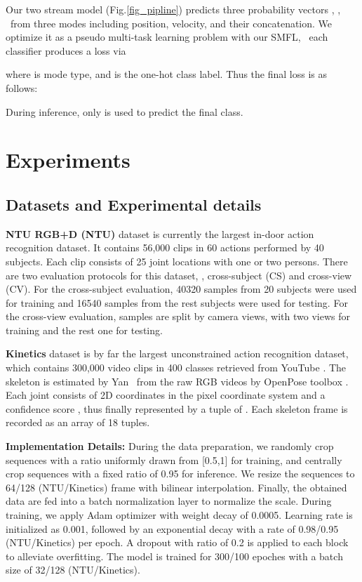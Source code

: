 \documentclass{article}
\begin{document}
Our two stream model (Fig.\ref{fig_pipline}) predicts three probability vectors , , \ from three modes including position, velocity, and their concatenation. We optimize it as a pseudo multi-task learning problem with our SMFL, \ie~each classifier produces a loss via
{\myfont
	
}where  is mode type, and {\myfont} is the one-hot class label. Thus the final loss is as follows:
{\myfont
	
}During inference, only  is used to predict the final class.

\section{Experiments}
\subsection{Datasets and Experimental details}
\textbf{NTU RGB+D (NTU)} dataset  \cite{DBLP:conf/cvpr/ShahroudyLNW16} is currently the largest in-door action recognition dataset. It contains 56,000 clips in 60 actions performed by 40 subjects. Each clip consists of 25 joint locations with one or two persons. There are two evaluation protocols for this dataset, \ie, cross-subject (CS) and cross-view (CV). For the cross-subject evaluation, 40320 samples from 20 subjects were used for training and 16540 samples from the rest subjects were used for testing. For the cross-view evaluation, samples are split by camera views, with two views for training and the rest one for testing.

\textbf{Kinetics} dataset is by far the largest unconstrained action recognition dataset, which contains 300,000 video clips
in 400 classes retrieved from YouTube \cite{DBLP:conf/aaai/YanXL18}. The skeleton is estimated by Yan \etal~from the raw RGB videos by OpenPose toolbox \cite{DBLP:conf/aaai/YanXL18}. Each joint consists of 2D coordinates  in the pixel coordinate system and a confidence score , thus finally represented by a tuple of . Each skeleton frame is recorded as an array of 18 tuples. 

\textbf{Implementation Details:} During the data preparation,
we randomly crop sequences with a ratio uniformly drawn from [0.5,1] for training, and centrally crop sequences with a fixed ratio of 0.95 for inference. We resize the sequences to 64/128 (NTU/Kinetics) frame with bilinear interpolation. Finally, the obtained data are fed into a batch normalization layer to normalize the scale. During training, we apply Adam optimizer with  weight decay of 0.0005. Learning rate is initialized as 0.001, followed by an exponential decay with a rate of 0.98/0.95 (NTU/Kinetics) per epoch. A dropout with ratio of 0.2 is applied to each block to alleviate overfitting. The model is trained for 300/100 epoches with a batch size of 32/128 (NTU/Kinetics).
\end{document}
